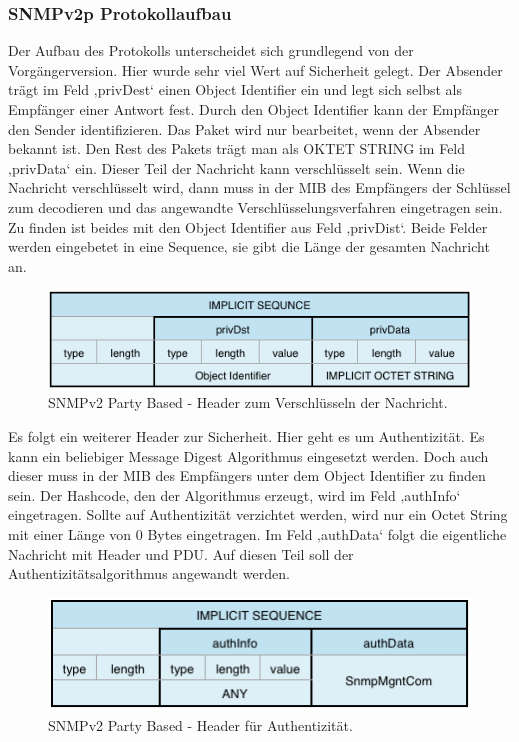 \documentclass[11pt,a4paper]{article}
\begin{document}
\subsubsection{SNMPv2p Protokollaufbau}
Der Aufbau des Protokolls unterscheidet sich grundlegend von der Vorgängerversion. Hier wurde sehr viel Wert auf Sicherheit gelegt. Der Absender trägt im Feld ‚privDest‘ einen Object Identifier ein und legt sich selbst als Empfänger einer Antwort fest. Durch den Object Identifier kann der Empfänger den Sender identifizieren. Das Paket wird nur bearbeitet, wenn der Absender bekannt ist. Den Rest des Pakets trägt man als OKTET STRING im Feld ‚privData‘ ein. Dieser Teil der Nachricht kann verschlüsselt sein. Wenn die Nachricht verschlüsselt wird, dann muss in der MIB des Empfängers der Schlüssel zum decodieren und das angewandte Verschlüsselungsverfahren eingetragen sein. Zu finden ist beides mit den Object Identifier aus Feld ‚privDist‘. Beide Felder werden eingebetet in eine Sequence, sie gibt die Länge der gesamten Nachricht an.\\
\begin{figure}[h]
	\centering
	\includegraphics[scale=1]{Bilder/SNMPv2p-Header-Encode}
	\caption{SNMPv2 Party Based - Header zum Verschlüsseln der Nachricht.}
\end{figure}
Es folgt ein weiterer Header zur Sicherheit. Hier geht es um Authentizität. Es kann ein beliebiger Message Digest Algorithmus eingesetzt werden. Doch auch dieser muss in der MIB des Empfängers unter dem Object Identifier zu finden sein. Der Hashcode, den der Algorithmus erzeugt, wird im Feld ‚authInfo‘ eingetragen. Sollte auf Authentizität verzichtet werden, wird nur ein Octet String mit einer Länge von 0 Bytes eingetragen. Im Feld ‚authData‘ folgt die eigentliche Nachricht mit Header und PDU. Auf diesen Teil soll der Authentizitätsalgorithmus angewandt werden.\\
\begin{figure}[h]
	\centering
	\includegraphics[scale=1]{Bilder/SNMPv2p-Header-Authentizitaet}
	\caption{SNMPv2 Party Based - Header für Authentizität.}
\end{figure}
\end{document}

